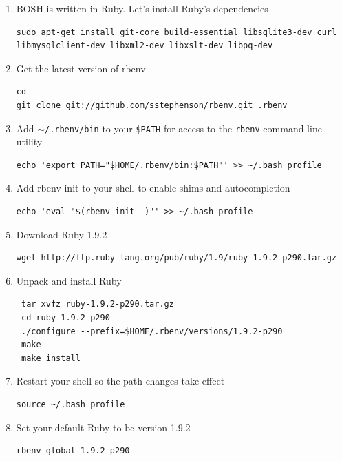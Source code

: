 \begin{enumerate}
\item BOSH is written in Ruby. Let's install Ruby's dependencies

\begin{verbatim}
sudo apt-get install git-core build-essential libsqlite3-dev curl libmysqlclient-dev libxml2-dev libxslt-dev libpq-dev
\end{verbatim}


\item Get the latest version of rbenv

\begin{verbatim}
cd
git clone git://github.com/sstephenson/rbenv.git .rbenv
\end{verbatim}


\item Add \texttt{\ensuremath{\sim}\slash .rbenv\slash bin} to your \texttt{\$PATH} for access to the \texttt{rbenv} command-line utility

\begin{verbatim}
echo 'export PATH="$HOME/.rbenv/bin:$PATH"' >> ~/.bash_profile
\end{verbatim}


\item Add rbenv init to your shell to enable shims and autocompletion

\begin{verbatim}
echo 'eval "$(rbenv init -)"' >> ~/.bash_profile
\end{verbatim}


\item Download Ruby 1.9.2

\begin{verbatim}
wget http://ftp.ruby-lang.org/pub/ruby/1.9/ruby-1.9.2-p290.tar.gz
\end{verbatim}


\item Unpack and install Ruby

\begin{verbatim}
 tar xvfz ruby-1.9.2-p290.tar.gz
 cd ruby-1.9.2-p290
 ./configure --prefix=$HOME/.rbenv/versions/1.9.2-p290
 make
 make install
\end{verbatim}


\item Restart your shell so the path changes take effect

\begin{verbatim}
source ~/.bash_profile
\end{verbatim}


\item Set your default Ruby to be version 1.9.2

\begin{verbatim}
rbenv global 1.9.2-p290
\end{verbatim}


\end{enumerate}


